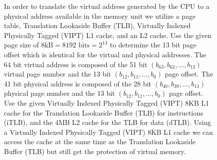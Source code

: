 \documentclass[main.tex]{subfiles}
\begin{document}
\begin{enumerate}
    \begin{figure}
    \centering{}
    \caption{In order to translate the virtual address generated by the CPU to a physical address available in the memory unit we utilize a page table, Translation Lookaside Buffer (TLB), Virtually Indexed Physically Tagged (VIPT) L1 cache, and an L2 cache. Use the given page size of $8\text{kB} = 8192 \text{ bits} = 2^{13}$  to determine the 13 bit page offset which is identical for the virtual and physical addresses. The 64 bit virtual address is composed of the 51 bit $\left(b_{63},b_{62},\dots,b_{13}\right)$ virtual page number and the 13 bit $\left(b_{12},b_{11},\dots,b_{0}\right)$ page offset. The 41 bit physical address is composed of the 28 bit $\left(b_{40},b_{39},\dots,b_{13}\right)$ physical page number and the 13 bit $\left(b_{12},b_{11},\dots,b_{0}\right)$ page offset. Use the given Virtually Indexed Physically Tagged (VIPT) 8KB L1 cache for the Translation Lookaside Buffer (TLB) for instructions (iTLB), and the 4MB L2 cache for the TLB for data (dTLB). Using a Virtually Indexed Physically Tagged (VIPT) 8KB L1 cache we can access the cache at the same time as the Translation Lookaside Buffer (TLB) but still get the protection of virtual memory.}
    \label{fig:03_translation_general}
    \end{figure}
    

\end{enumerate}
\end{document}
